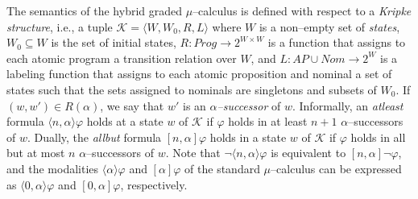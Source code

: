 \documentclass{LMCS}
\theoremstyle{plain}
\def \K             {\mathcal{K}}
\newcommand \tpl[1] {\langle #1 \rangle}
\begin{document}
The semantics of the hybrid graded $\mu$--calculus is defined with respect to a
\emph{Kripke structure}, i.e., a tuple $\K = \tpl{W,W_0,R,L}$ where $W$ is a
non--empty set of \emph{states}, $W_0 \subseteq W$ is the set of initial
states, $R : \mathit{Prog} \rightarrow 2^{W \times W}$ is a function that
assigns to each atomic program a transition relation over $W$, and $L:AP \cup
\mathit{Nom} \rightarrow 2^{W}$ is a labeling function that assigns to each
atomic proposition and nominal a set of states such that the sets assigned to
nominals are singletons and subsets of $W_0$. If $(w,w')\in R(\alpha)$, we say
that $w'$ is an \emph{$\alpha$--successor} of $w$. Informally, an
\emph{atleast} formula $\tpl{n,\alpha}\varphi$ holds at a state $w$ of $\K$ if
$\varphi$ holds in at least $n+1$ $\alpha$--successors of $w$. Dually, the
\emph{allbut} formula $[n, \alpha] \varphi$ holds in a state $w$ of $\K$ if
$\varphi$ holds in all but at most $n$ $\alpha$--successors of $w$. Note that
$\neg \tpl{n,\alpha} \varphi$ is equivalent to $[n, \alpha]\neg \varphi$, and
the modalities $\langle \alpha \rangle \varphi$ and $[\alpha] \varphi$ of the
standard $\mu$--calculus can be expressed as $\tpl{0,\alpha} \varphi$ and
$[0,\alpha] \varphi$, respectively.
\end{document}
